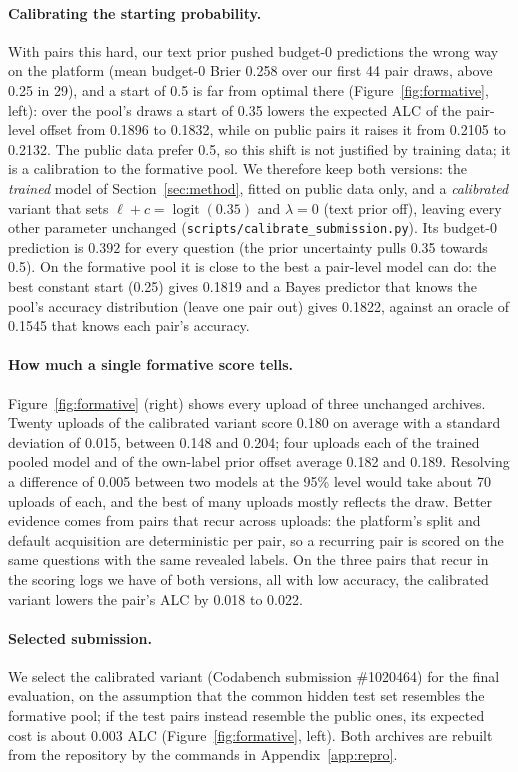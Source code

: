 \documentclass{article}
\newcommand{\selectedid}{1020464}
\newcommand{\code}[1]{\texttt{#1}}
\begin{document}
\paragraph{Calibrating the starting probability.} With pairs this hard, our text prior pushed budget-0 predictions the wrong way on the platform (mean budget-0 Brier 0.258 over our first 44 pair draws, above 0.25 in 29), and a start of 0.5 is far from optimal there (Figure~\ref{fig:formative}, left): over the pool's draws a start of 0.35 lowers the expected ALC of the pair-level offset from 0.1896 to 0.1832, while on public pairs it raises it from 0.2105 to 0.2132. The public data prefer 0.5, so this shift is not justified by training data; it is a calibration to the formative pool. We therefore keep both versions: the \emph{trained} model of Section~\ref{sec:method}, fitted on public data only, and a \emph{calibrated} variant that sets $\ell + c = \operatorname{logit}(0.35)$ and $\lambda = 0$ (text prior off), leaving every other parameter unchanged (\code{scripts/calibrate\_submission.py}). Its budget-0 prediction is $0.392$ for every question (the prior uncertainty pulls 0.35 towards 0.5). On the formative pool it is close to the best a pair-level model can do: the best constant start (0.25) gives 0.1819 and a Bayes predictor that knows the pool's accuracy distribution (leave one pair out) gives 0.1822, against an oracle of 0.1545 that knows each pair's accuracy.

\paragraph{How much a single formative score tells.} Figure~\ref{fig:formative} (right) shows every upload of three unchanged archives. Twenty uploads of the calibrated variant score 0.180 on average with a standard deviation of 0.015, between 0.148 and 0.204; four uploads each of the trained pooled model and of the own-label prior offset average 0.182 and 0.189. Resolving a difference of 0.005 between two models at the 95\% level would take about 70 uploads of each, and the best of many uploads mostly reflects the draw. Better evidence comes from pairs that recur across uploads: the platform's split and default acquisition are deterministic per pair, so a recurring pair is scored on the same questions with the same revealed labels. On the three pairs that recur in the scoring logs we have of both versions, all with low accuracy, the calibrated variant lowers the pair's ALC by 0.018 to 0.022.

\paragraph{Selected submission.} We select the calibrated variant (Codabench submission \#\selectedid) for the final evaluation, on the assumption that the common hidden test set resembles the formative pool; if the test pairs instead resemble the public ones, its expected cost is about 0.003 ALC (Figure~\ref{fig:formative}, left). Both archives are rebuilt from the repository by the commands in Appendix~\ref{app:repro}.
\end{document}
